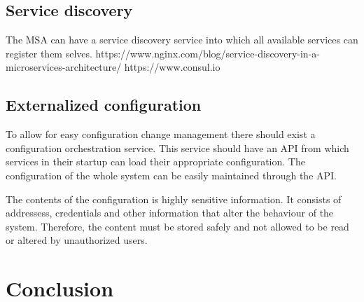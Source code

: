 \begin{sloppypar}
\begin{sloppypar}
\end{sloppypar}

\subsection{Service discovery}
\begin{sloppypar}
    The MSA can have a service discovery service into which all available services 
    can register them selves.
    https://www.nginx.com/blog/service-discovery-in-a-microservices-architecture/
    https://www.consul.io
\end{sloppypar}

\subsection{Externalized configuration}
\begin{sloppypar}
    To allow for easy configuration change management there should exist a 
    configuration orchestration service. This service should have an API from 
    which services in their startup can load their appropriate configuration. 
    The configuration of the whole system can be easily maintained through the 
    API.
\end{sloppypar}
\begin{sloppypar}
    The contents of the configuration is highly sensitive information. It 
    consists of addressess, credentials and other information that alter 
    the behaviour of the system. Therefore, the content must be stored safely 
    and not allowed to be read or altered by unauthorized users.
\end{sloppypar}





\section{Conclusion}
\begin{sloppypar}

\end{sloppypar}




\end{sloppypar}
